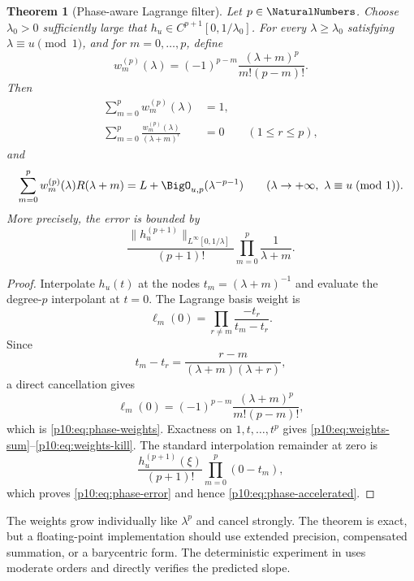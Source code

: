 \documentclass[11pt]{article}
\numberwithin{equation}{section}
\newtheorem{theorem}{Theorem}[section]
\theoremstyle{definition}
\theoremstyle{remark}
\begin{document}
\begin{theorem}[Phase-aware Lagrange filter]
\label{p10:thm:phase-lagrange}
Let $p\in\NaturalNumbers$.  Choose $\lambda_0>0$ sufficiently large that
$h_u\in C^{p+1}[0,1/\lambda_0]$.  For every $\lambda\ge\lambda_0$ satisfying
$\lambda\equiv u\pmod1$, and for $m=0,\ldots,p$, define
\begin{equation}
 w_m^{(p)}(\lambda)
 =(-1)^{p-m}\frac{(\lambda+m)^p}{m!(p-m)!}.                  \label{p10:eq:phase-weights}
\end{equation}
Then
\begin{align}
 \sum_{m=0}^{p}w_m^{(p)}(\lambda)&=1,                       \label{p10:eq:weights-sum}\\
 \sum_{m=0}^{p}\frac{w_m^{(p)}(\lambda)}{(\lambda+m)^r}&=0
 \qquad(1\le r\le p),                                      \label{p10:eq:weights-kill}
\end{align}
and
\begin{equation}
 \sum_{m=0}^{p}w_m^{(p)}(\lambda)R(\lambda+m)
 =L+\BigO_{u,p}(\lambda^{-p-1})
 \qquad(\lambda\to+\infty,\ \lambda\equiv u\!\pmod1).    \label{p10:eq:phase-accelerated}
\end{equation}
More precisely, the error is bounded by
\begin{equation}
 \frac{\|h_u^{(p+1)}\|_{L^\infty[0,1/\lambda]}}{(p+1)!}
 \prod_{m=0}^{p}\frac{1}{\lambda+m}.                        \label{p10:eq:phase-error}
\end{equation}
\end{theorem}

\begin{proof}
Interpolate $h_u(t)$ at the nodes
$t_m=(\lambda+m)^{-1}$ and evaluate the degree-$p$ interpolant at $t=0$.  The Lagrange basis
weight is
\[
 \ell_m(0)=\prod_{r\ne m}\frac{-t_r}{t_m-t_r}.
\]
Since
\[
 t_m-t_r=\frac{r-m}{(\lambda+m)(\lambda+r)},
\]
a direct cancellation gives
\[
 \ell_m(0)
 =(-1)^{p-m}\frac{(\lambda+m)^p}{m!(p-m)!},
\]
which is \eqref{p10:eq:phase-weights}.  Exactness on $1,t,\ldots,t^p$ gives
\eqref{p10:eq:weights-sum}--\eqref{p10:eq:weights-kill}.  The standard interpolation remainder at
zero is
\[
 \frac{h_u^{(p+1)}(\xi)}{(p+1)!}\prod_{m=0}^{p}(0-t_m),
\]
which proves \eqref{p10:eq:phase-error} and hence \eqref{p10:eq:phase-accelerated}.
\end{proof}

\begin{remark}[Conditioning]
The weights grow individually like $\lambda^p$ and cancel strongly.  The theorem is exact,
but a floating-point implementation should use extended precision, compensated summation,
or a barycentric form.  The deterministic experiment in  uses moderate
orders and directly verifies the predicted slope.
\end{remark}
\end{document}
